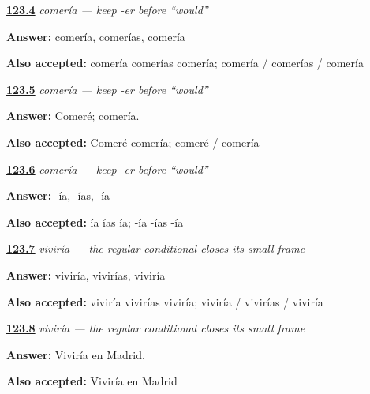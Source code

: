 \noindent\begin{minipage}[t]{\linewidth}
\raggedright
\hyperlink{review-ES-C17-comer-condicional-singular-forms}{\textbf{123.4}} \emph{comería — keep -er before “would”}\par
\small \textbf{Answer:} comería, comerías, comería\par
\footnotesize \textbf{Also accepted:} comería comerías comería; comería / comerías / comería
\end{minipage}\par\medskip

\noindent\begin{minipage}[t]{\linewidth}
\raggedright
\hyperlink{review-ES-C17-comer-condicional-future-pair}{\textbf{123.5}} \emph{comería — keep -er before “would”}\par
\small \textbf{Answer:} Comeré; comería.\par
\footnotesize \textbf{Also accepted:} Comeré comería; comeré / comería
\end{minipage}\par\medskip

\noindent\begin{minipage}[t]{\linewidth}
\raggedright
\hyperlink{review-ES-C17-comer-condicional-shared-endings}{\textbf{123.6}} \emph{comería — keep -er before “would”}\par
\small \textbf{Answer:} -ía, -ías, -ía\par
\footnotesize \textbf{Also accepted:} ía ías ía; -ía -ías -ía
\end{minipage}\par\medskip

\noindent\begin{minipage}[t]{\linewidth}
\raggedright
\hyperlink{review-ES-C17-vivir-condicional-singular-forms}{\textbf{123.7}} \emph{viviría — the regular conditional closes its small frame}\par
\small \textbf{Answer:} viviría, vivirías, viviría\par
\footnotesize \textbf{Also accepted:} viviría vivirías viviría; viviría / vivirías / viviría
\end{minipage}\par\medskip

\noindent\begin{minipage}[t]{\linewidth}
\raggedright
\hyperlink{review-ES-C17-vivir-condicional-madrid}{\textbf{123.8}} \emph{viviría — the regular conditional closes its small frame}\par
\small \textbf{Answer:} Viviría en Madrid.\par
\footnotesize \textbf{Also accepted:} Viviría en Madrid
\end{minipage}\par\medskip

